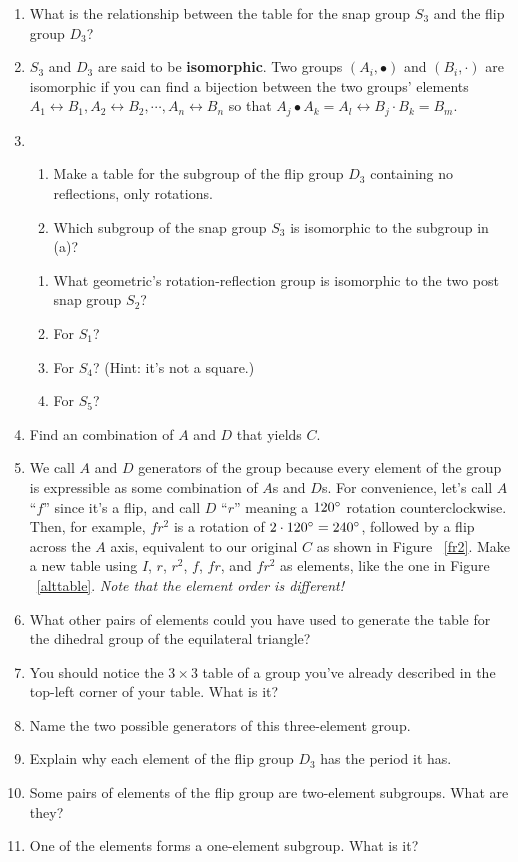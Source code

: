 \documentclass[../gatm.tex]{subfiles}
\begin{document}
\begin{enumerate}
\setcounter{enumi}{\theenumLast}
\item What is the relationship between the table for the snap group $S_3$ and the flip group $D_3$?
\item $S_3$ and $D_3$ are said to be \textbf{isomorphic}. Two groups $({A_i}, \bullet)$ and $({B_i}, \cdot)$ are isomorphic if you can find a bijection between the two groups' elements $A_1\leftrightarrow B_1, A_2\leftrightarrow B_2, \cdots, A_n \leftrightarrow B_n$ so that $A_j \bullet A_k = A_l \leftrightarrow B_j \cdot B_k = B_m$.
\item \begin{enumerate}
\item Make a table for the subgroup of the flip group $D_3$ containing no reflections, only rotations.
\item Which subgroup of the snap group $S_3$ is isomorphic to the subgroup in (a)?
\end{enumerate}
\begin{enumerate}
\item What geometric's rotation-reflection group is isomorphic to the two post snap group $S_2$?
\item For $S_1$?
\item For $S_4$? (Hint: it's not a square.)
\item For $S_5$?
\end{enumerate}
\item Find an combination of $A$ and $D$ that yields $C$.
\item We call $A$ and $D$ generators of the group because every element of the group is expressible as some combination of $A$s and $D$s. For convenience, let's call $A$ ``$f$'' since it's a flip, and call $D$ ``$r$'' meaning a $120^\circ$ rotation counterclockwise. Then, for example, $fr^2$ is a rotation of $2\cdot 120^\circ = 240^\circ$, followed by a flip across the $A$ axis, equivalent to our original $C$ as shown in Figure ~\ref{fr2}. Make a new table using $I$, $r$, $r^2$, $f$, $fr$, and $fr^2$ as elements, like the one in Figure ~\ref{alttable}. \textit{Note that the element order is different!}
\item What other pairs of elements could you have used to generate the table for the dihedral group of the equilateral triangle?
\item You should notice the $3\times 3$ table of a group you've already described in the top-left corner of your table. What is it?
\item Name the two possible generators of this three-element group.
\item Explain why each element of the flip group $D_3$ has the period it has.
\item Some pairs of elements of the flip group are two-element subgroups. What are they?
\item One of the elements forms a one-element subgroup. What is it?
\setcounter{enumLast}{\theenumi}
\end{enumerate}
\end{document}
